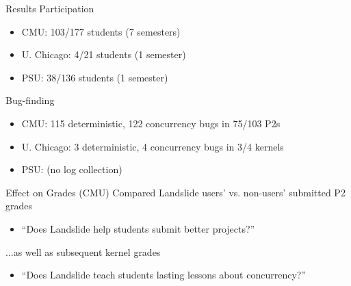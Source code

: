 \documentclass[xcolor=dvipsnames]{beamer}
\begin{document}
\begin{frame}{Results}
	Participation
	\begin{itemize}
		\item CMU: 103/177 students (7 semesters)
		\item U. Chicago: 4/21 students (1 semester)
		\item PSU: 38/136 students (1 semester)
	\end{itemize}
	\linegap

	Bug-finding
	\begin{itemize}
		\item CMU: 115 deterministic, 122 concurrency bugs in 75/103 P2s
		\item U. Chicago: 3 deterministic, 4 concurrency bugs in 3/4 kernels
		\item PSU: (no log collection) %
	\end{itemize}
\end{frame}

\begin{frame}{Effect on Grades (CMU)}
	Compared Landslide users' vs. non-users' submitted P2 grades
	\begin{itemize}
		\item ``Does Landslide help students submit better projects?''
	\end{itemize}
	\linegap

	...as well as subsequent kernel grades
	\begin{itemize}
		\item ``Does Landslide teach students lasting lessons about concurrency?''
	\end{itemize}
\end{frame}
\end{document}
